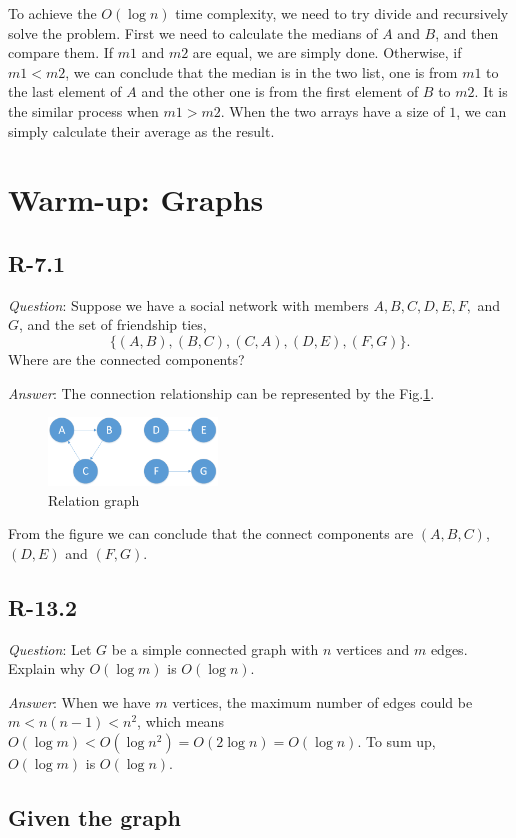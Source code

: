 \documentclass[11pt]{article}
\begin{document}
	To achieve the $O(\log n)$ time complexity, we need to try divide and recursively solve the problem. First we need to calculate the medians of $A$ and $B$, and then compare them. If $m1$ and $m2$ are equal, we are simply done. Otherwise, if $m1<m2$, we can conclude that the median is in the two list, one is from $m1$ to the last element of $A$ and the other one is from the first element of $B$ to $m2$. It is the similar process when $m1>m2$. When the two arrays have a size of $1$, we can simply calculate their average as the result.
\section{Warm-up: Graphs}
\subsection{R-7.1}
\noindent \emph{Question}: Suppose we have a social network with members $A,B,C,D,E,F,$ and $G$, and the set of friendship ties,
\begin{equation*}
	\{(A,B),(B,C),(C,A),(D,E),(F,G)\}.
\end{equation*}
Where are the connected components?

\noindent \emph{Answer}: The connection relationship can be represented by the Fig.\ref{fig:fig1}.
	\begin{figure}[h]
		\centering
		\includegraphics[width=0.4\textwidth]{Figure/Fig1.png}
		\caption{Relation graph}
		\label{fig:fig1}
	\end{figure}

From the figure we can conclude that the connect components are $(A,B,C)$, $(D,E)$ and $(F,G)$.
\subsection{R-13.2}
\noindent \emph{Question}: Let $G$ be a simple connected graph with $n$ vertices and $m$ edges. Explain why $O(\log m)$ is $O(\log n)$.

\noindent \emph{Answer}: When we have $m$ vertices, the maximum number of edges could be $m<n(n-1)<n^2$, which means $O(\log m)<O(\log n^2)= O(2\log n)=O(\log n)$. To sum up, $O(\log m)$ is $O(\log n)$.
\subsection{Given the graph}
\end{document}
